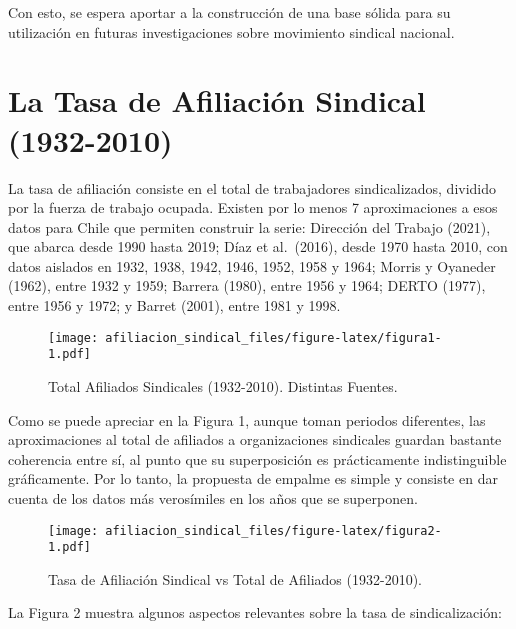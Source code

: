 \documentclass[
]{article}
\begin{document}
Con esto, se espera aportar a la construcción de una base sólida para su
utilización en futuras investigaciones sobre movimiento sindical
nacional.

\hypertarget{la-tasa-de-afiliaciuxf3n-sindical-1932-2010}{%
\section{La Tasa de Afiliación Sindical
(1932-2010)}\label{la-tasa-de-afiliaciuxf3n-sindical-1932-2010}}

La tasa de afiliación consiste en el total de trabajadores
sindicalizados, dividido por la fuerza de trabajo ocupada. Existen por
lo menos 7 aproximaciones a esos datos para Chile que permiten construir
la serie: Dirección del Trabajo (2021), que abarca desde 1990 hasta
2019; Díaz et al.~(2016), desde 1970 hasta 2010, con datos aislados en
1932, 1938, 1942, 1946, 1952, 1958 y 1964; Morris y Oyaneder (1962),
entre 1932 y 1959; Barrera (1980), entre 1956 y 1964; DERTO (1977),
entre 1956 y 1972; y Barret (2001), entre 1981 y 1998.

\begin{figure}
\centering
\texttt{[image: afiliacion\_sindical\_files/figure-latex/figura1-1.pdf]}
\caption{Total Afiliados Sindicales (1932-2010). Distintas Fuentes.}
\end{figure}

Como se puede apreciar en la Figura 1, aunque toman periodos diferentes,
las aproximaciones al total de afiliados a organizaciones sindicales
guardan bastante coherencia entre sí, al punto que su superposición es
prácticamente indistinguible gráficamente. Por lo tanto, la propuesta de
empalme es simple y consiste en dar cuenta de los datos más verosímiles
en los años que se superponen.

\begin{figure}
\centering
\texttt{[image: afiliacion\_sindical\_files/figure-latex/figura2-1.pdf]}
\caption{Tasa de Afiliación Sindical vs Total de Afiliados (1932-2010).}
\end{figure}

La Figura 2 muestra algunos aspectos relevantes sobre la tasa de
sindicalización:
\end{document}
